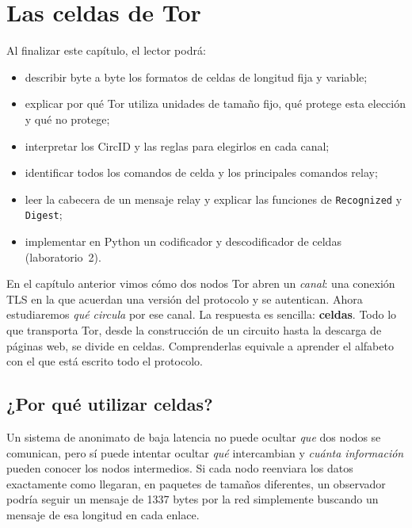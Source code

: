\chapter{Las celdas de Tor}\label{cap:08-celle}

\begin{obiettivi}
Al finalizar este capítulo, el lector podrá:
\begin{itemize}[nosep]
  \item describir byte a byte los formatos de celdas de longitud fija y variable;
  \item explicar por qué Tor utiliza unidades de tamaño fijo, qué protege esta elección y qué no protege;
  \item interpretar los CircID y las reglas para elegirlos en cada canal;
  \item identificar todos los comandos de celda y los principales comandos relay;
  \item leer la cabecera de un mensaje relay y explicar las funciones de \texttt{Recognized} y \texttt{Digest};
  \item implementar en Python un codificador y descodificador de celdas (laboratorio~2).
\end{itemize}
\end{obiettivi}

En el capítulo anterior vimos cómo dos nodos Tor abren un \emph{canal}: una conexión TLS en la que acuerdan una versión del protocolo y se autentican. Ahora estudiaremos \emph{qué circula} por ese canal. La respuesta es sencilla: \textbf{celdas}. Todo lo que transporta Tor, desde la construcción de un circuito hasta la descarga de páginas web, se divide en celdas. Comprenderlas equivale a aprender el alfabeto con el que está escrito todo el protocolo.

\section{¿Por qué utilizar celdas?}\label{sec:celle-perche}

Un sistema de anonimato de baja latencia no puede ocultar \emph{que} dos nodos se comunican, pero sí puede intentar ocultar \emph{qué} intercambian y \emph{cuánta información} pueden conocer los nodos intermedios. Si cada nodo reenviara los datos exactamente como llegaran, en paquetes de tamaños diferentes, un observador podría seguir un mensaje de 1337 bytes por la red simplemente buscando un mensaje de esa longitud en cada enlace.

